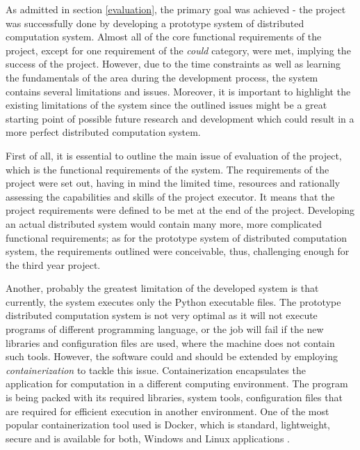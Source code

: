 \documentclass[10pt]{report}
\begin{document}
As admitted in section \ref{evaluation}, the primary goal was achieved - the project was successfully done by developing a prototype system of distributed computation system. Almost all of the core functional requirements of the project, except for one requirement of the \textit{could} category, were met, implying the success of the project. However, due to the time constraints as well as learning the fundamentals of the area during the development process, the system contains several limitations and issues. Moreover, it is important to highlight the existing limitations of the system since the outlined issues might be a great starting point of possible future research and development which could result in a more perfect distributed computation system.
\newline

First of all, it is essential to outline the main issue of evaluation of the project, which is the functional requirements of the system. The requirements of the project were set out, having in mind the limited time, resources and rationally assessing the capabilities and skills of the project executor. It means that the project requirements were defined to be met at the end of the project. Developing an actual distributed system would contain many more, more complicated functional requirements; as for the prototype system of distributed computation system, the requirements outlined were conceivable, thus, challenging enough for the third year project.
\newline

Another, probably the greatest limitation of the developed system is that currently, the system executes only the Python executable files. The prototype distributed computation system is not very optimal as it will not execute programs of different programming language, or the job will fail if the new libraries and configuration files are used, where the machine does not contain such tools. However, the software could and should be extended by employing \textit{containerization} to tackle this issue. Containerization encapsulates the application for computation in a different computing environment. The program is being packed with its required libraries, system tools, configuration files that are required for efficient execution in another environment. One of the most popular containerization tool used is Docker, which is standard, lightweight, secure and is available for both, Windows and Linux applications \cite{docker}.
\newline
\end{document}
